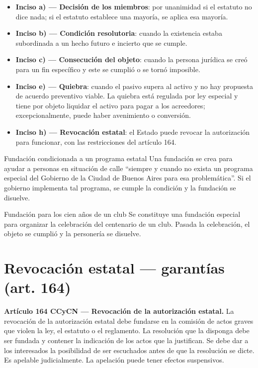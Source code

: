 \documentclass[12pt,oneside]{book}
\begin{document}
\begin{itemize}
    \item \textbf{Inciso a) --- Decisión de los miembros}: por unanimidad si el estatuto no dice nada; si el estatuto establece una mayoría, se aplica esa mayoría.
    \item \textbf{Inciso b) --- Condición resolutoria}: cuando la existencia estaba subordinada a un hecho futuro e incierto que se cumple.
    \item \textbf{Inciso c) --- Consecución del objeto}: cuando la persona jurídica se creó para un fin específico y este se cumplió o se tornó imposible.
    \item \textbf{Inciso e) --- Quiebra}: cuando el pasivo supera al activo y no hay propuesta de acuerdo preventivo viable. La quiebra está regulada por ley especial y tiene por objeto liquidar el activo para pagar a los acreedores; excepcionalmente, puede haber avenimiento o conversión.
    \item \textbf{Inciso h) --- Revocación estatal}: el Estado puede revocar la autorización para funcionar, con las restricciones del artículo 164.
\end{itemize}

\begin{example}{Fundación condicionada a un programa estatal}
Una fundación se crea para ayudar a personas en situación de calle ``siempre y cuando no exista un programa especial del Gobierno de la Ciudad de Buenos Aires para esa problemática''. Si el gobierno implementa tal programa, se cumple la condición y la fundación se disuelve.
\end{example}

\begin{example}{Fundación para los cien años de un club}
Se constituye una fundación especial para organizar la celebración del centenario de un club. Pasada la celebración, el objeto se cumplió y la personería se disuelve.
\end{example}

\section{Revocación estatal --- garantías (art. 164)}

\begin{important}
\textbf{Artículo 164 CCyCN --- Revocación de la autorización estatal.} La revocación de la autorización estatal debe fundarse en la comisión de actos graves que violen la ley, el estatuto o el reglamento. La resolución que la disponga debe ser fundada y contener la indicación de los actos que la justifican. Se debe dar a los interesados la posibilidad de ser escuchados antes de que la resolución se dicte. Es apelable judicialmente. La apelación puede tener efectos suspensivos.
\end{important}
\end{document}
